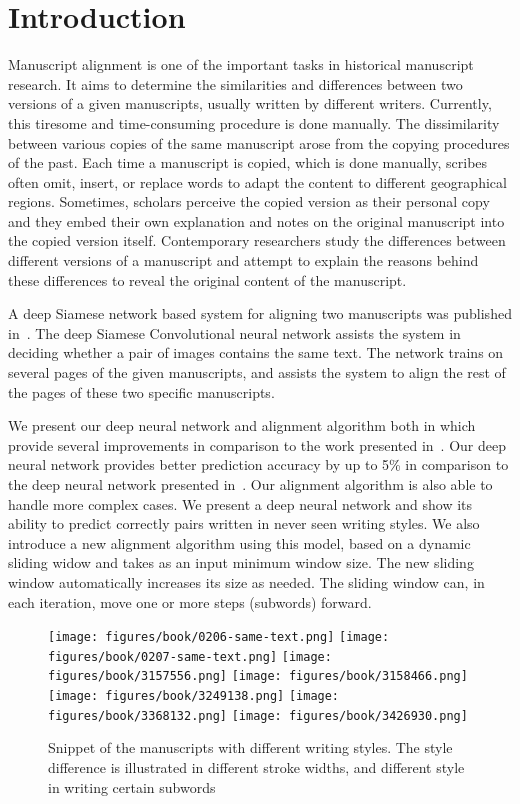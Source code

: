 \documentclass[10pt, a4paper, conference, compsocconf]{IEEEtran}
\begin{document}
\section{Introduction}
Manuscript alignment is one of the important tasks in historical manuscript research. It aims to determine the similarities and differences between two versions of a given manuscripts, usually written by different writers. Currently, this tiresome and time-consuming procedure is done manually. The dissimilarity between various copies of the same manuscript arose from the copying procedures of the past. Each time a manuscript is copied, which is done manually, scribes often omit, insert, or replace words to adapt the content to different geographical regions. Sometimes, scholars perceive the copied version as their personal copy and they embed their own explanation and notes on the original manuscript into the copied version itself. Contemporary researchers study the differences between different versions of a manuscript and attempt to explain the reasons behind these differences to reveal the original content of the manuscript.

A deep Siamese network based system for aligning two manuscripts was published in~\cite{kassis2017siamese}. The deep Siamese Convolutional neural network assists the system in deciding whether a pair of images contains the same text. The network trains on several pages of the given manuscripts, and assists the system to align the rest of the pages of these two specific manuscripts.

We present our deep neural network and alignment algorithm both in which provide several improvements in comparison to the work presented in~\cite{kassis2017siamese}. Our deep neural network provides better prediction accuracy by up to 5\% in comparison to the deep neural network presented in~\cite{kassis2017siamese}. Our alignment algorithm is also able to handle more complex cases. We present a deep neural network and show its ability to predict correctly pairs written in never seen writing styles. We also introduce a new alignment algorithm using this model, based on a dynamic sliding widow and takes as an input minimum window size. The new sliding window automatically increases its size as needed. The sliding window can, in each iteration, move one or more steps (subwords) forward.

\begin{figure*}[!bt]
	\centering
	\texttt{[image: figures/book/0206-same-text.png]}
	\texttt{[image: figures/book/0207-same-text.png]}
	\texttt{[image: figures/book/3157556.png]}
	\texttt{[image: figures/book/3158466.png]}
	\texttt{[image: figures/book/3249138.png]}
	\texttt{[image: figures/book/3368132.png]}
	\texttt{[image: figures/book/3426930.png]}
	\caption{Snippet of the manuscripts with different writing styles. The style difference is illustrated in different stroke widths, and different style in writing certain subwords}
	\label{figure:writingStyles}
\end{figure*}
\end{document}
